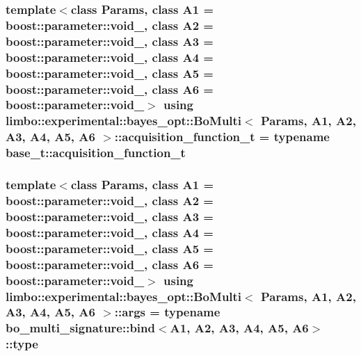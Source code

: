 \subsubsection[{acquisition\+\_\+function\+\_\+t}]{\setlength{\rightskip}{0pt plus 5cm}template$<$class Params, class A1 = boost\+::parameter\+::void\+\_\+, class A2 = boost\+::parameter\+::void\+\_\+, class A3 = boost\+::parameter\+::void\+\_\+, class A4 = boost\+::parameter\+::void\+\_\+, class A5 = boost\+::parameter\+::void\+\_\+, class A6 = boost\+::parameter\+::void\+\_\+$>$ using {\bf limbo\+::experimental\+::bayes\+\_\+opt\+::\+Bo\+Multi}$<$ Params, A1, A2, A3, A4, A5, A6 $>$\+::{\bf acquisition\+\_\+function\+\_\+t} =  typename {\bf base\+\_\+t\+::acquisition\+\_\+function\+\_\+t}}\label{classlimbo_1_1experimental_1_1bayes__opt_1_1_bo_multi_aa9e161c2d3b75329a8470204c32f1458}
\hypertarget{classlimbo_1_1experimental_1_1bayes__opt_1_1_bo_multi_a9ab4aaa59b6c7495da8e0220622efdea}{}
\subsubsection[{args}]{\setlength{\rightskip}{0pt plus 5cm}template$<$class Params, class A1 = boost\+::parameter\+::void\+\_\+, class A2 = boost\+::parameter\+::void\+\_\+, class A3 = boost\+::parameter\+::void\+\_\+, class A4 = boost\+::parameter\+::void\+\_\+, class A5 = boost\+::parameter\+::void\+\_\+, class A6 = boost\+::parameter\+::void\+\_\+$>$ using {\bf limbo\+::experimental\+::bayes\+\_\+opt\+::\+Bo\+Multi}$<$ Params, A1, A2, A3, A4, A5, A6 $>$\+::{\bf args} =  typename bo\+\_\+multi\+\_\+signature\+::bind$<$A1, A2, A3, A4, A5, A6$>$\+::type}\label{classlimbo_1_1experimental_1_1bayes__opt_1_1_bo_multi_a9ab4aaa59b6c7495da8e0220622efdea}
\hypertarget{classlimbo_1_1experimental_1_1bayes__opt_1_1_bo_multi_a96e3df5190731faf8d60b20d6810ba64}{}
